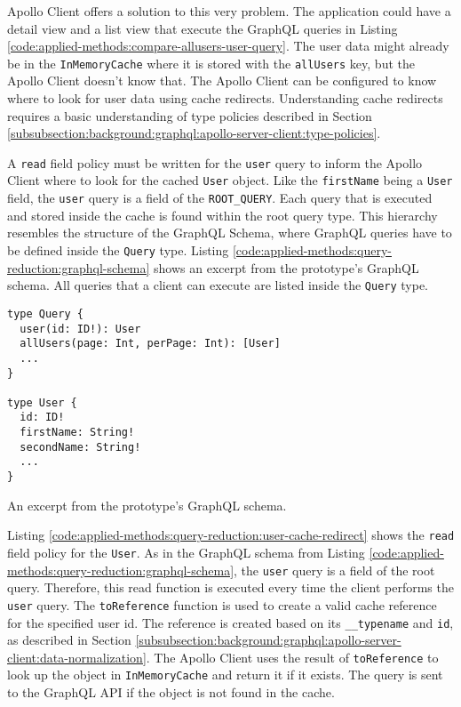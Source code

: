 \noindent Apollo Client offers a solution to this very problem. The application could have a detail view and a list view that execute the GraphQL queries in Listing \ref{code:applied-methods:compare-allusers-user-query}. The user data might already be in the \texttt{InMemoryCache} where it is stored with the \texttt{allUsers} key, but the Apollo Client doesn't know that. The Apollo Client can be configured to know where to look for user data using cache redirects. Understanding cache redirects requires a basic understanding of type policies described in Section \ref{subsubsection:background:graphql:apollo-server-client:type-policies}.

\bigskip

\noindent A \texttt{read} field policy must be written for the \texttt{user} query to inform the Apollo Client where to look for the cached \texttt{User} object. Like the \texttt{firstName} being a \texttt{User} field, the \texttt{user} query is a field of the \texttt{ROOT\_QUERY}. Each query that is executed and stored inside the cache is found within the root query type. This hierarchy resembles the structure of the GraphQL Schema, where GraphQL queries have to be defined inside the \texttt{Query} type. Listing \ref{code:applied-methods:query-reduction:graphql-schema} shows an excerpt from the prototype's GraphQL schema. All queries that a client can execute are listed inside the \texttt{Query} type.

\ifshowListings
\begin{listing}[H]
  \begin{verbatim}
type Query {
  user(id: ID!): User
  allUsers(page: Int, perPage: Int): [User]
  ...
}

type User {
  id: ID!
  firstName: String!
  secondName: String!
  ...
}
  \end{verbatim}
  \caption{An excerpt from the prototype's GraphQL schema.}\label{code:applied-methods:query-reduction:graphql-schema}
\end{listing}
\fi


\noindent Listing \ref{code:applied-methods:query-reduction:user-cache-redirect} shows the \texttt{read} field policy for the \texttt{User}. As in the GraphQL schema from Listing \ref{code:applied-methods:query-reduction:graphql-schema}, the \texttt{user} query is a field of the root query. Therefore, this read function is executed every time the client performs the \texttt{user} query. The \texttt{toReference} function is used to create a valid cache reference for the specified user id. The reference is created based on its \texttt{\_\_typename} and \texttt{id}, as described in Section \ref{subsubsection:background:graphql:apollo-server-client:data-normalization}. The Apollo Client uses the result of \texttt{toReference} to look up the object in \texttt{InMemoryCache} and return it if it exists. The query is sent to the GraphQL \ac{API} if the object is not found in the cache.

